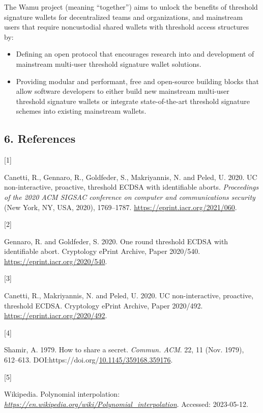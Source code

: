 \documentclass[
]{article}
\providecommand{\tightlist}{%
  \setlength{\itemsep}{0pt}\setlength{\parskip}{0pt}}
\newlength{\cslhangindent}
\newlength{\csllabelwidth}
\newlength{\cslentryspacingunit} %
\newenvironment{CSLReferences}[2] %
 {%
  \setlength{\parindent}{0pt}
  \ifodd #1
  \let\oldpar\par
  \def\par{\hangindent=\cslhangindent\oldpar}
  \fi
  \setlength{\parskip}{#2\cslentryspacingunit}
 }%
 {}
\newcommand{\CSLLeftMargin}[1]{\parbox[t]{\csllabelwidth}{#1}}
\newcommand{\CSLRightInline}[1]{\parbox[t]{\linewidth - \csllabelwidth}{#1}\break}
\begin{document}
The Wamu project (meaning ``together'') aims to unlock the benefits of
threshold signature wallets for decentralized teams and organizations,
and mainstream users that require noncustodial shared wallets with
threshold access structures by:

\begin{itemize}
\tightlist
\item
  Defining an open protocol that encourages research into and
  development of mainstream multi-user threshold signature wallet
  solutions.
\item
  Providing modular and performant, free and open-source building blocks
  that allow software developers to either build new mainstream
  multi-user threshold signature wallets or integrate state-of-the-art
  threshold signature schemes into existing mainstream wallets.
\end{itemize}

\hypertarget{references}{%
\subsection{6. References}\label{references}}

\hypertarget{refs}{}
\begin{CSLReferences}{0}{0}
\leavevmode{}%
\CSLLeftMargin{{[}1{]} }%
\CSLRightInline{Canetti, R., Gennaro, R., Goldfeder, S., Makriyannis, N.
and Peled, U. 2020. UC non-interactive, proactive, threshold ECDSA with
identifiable aborts. \emph{Proceedings of the 2020 ACM SIGSAC conference
on computer and communications security} (New York, NY, USA, 2020),
1769--1787. \url{https://eprint.iacr.org/2021/060}.}

\leavevmode{}%
\CSLLeftMargin{{[}2{]} }%
\CSLRightInline{Gennaro, R. and Goldfeder, S. 2020. One round threshold
ECDSA with identifiable abort. Cryptology ePrint Archive, Paper
2020/540. \url{https://eprint.iacr.org/2020/540}.}

\leavevmode{}%
\CSLLeftMargin{{[}3{]} }%
\CSLRightInline{Canetti, R., Makriyannis, N. and Peled, U. 2020. UC
non-interactive, proactive, threshold ECDSA. Cryptology ePrint Archive,
Paper 2020/492. \url{https://eprint.iacr.org/2020/492}.}

\leavevmode{}%
\CSLLeftMargin{{[}4{]} }%
\CSLRightInline{Shamir, A. 1979. How to share a secret. \emph{Commun.
ACM}. 22, 11 (Nov. 1979), 612--613.
DOI:https://doi.org/\href{https://doi.org/10.1145/359168.359176}{10.1145/359168.359176}.}

\leavevmode{}%
\CSLLeftMargin{{[}5{]} }%
\CSLRightInline{Wikipedia. Polynomial interpolation:
\href{https://en.wikipedia.org/wiki/Polynomial_interpolation}{\emph{https://en.wikipedia.org/wiki/Polynomial\_interpolation}}.
Accessed: 2023-05-12.}

\end{CSLReferences}
\end{document}
